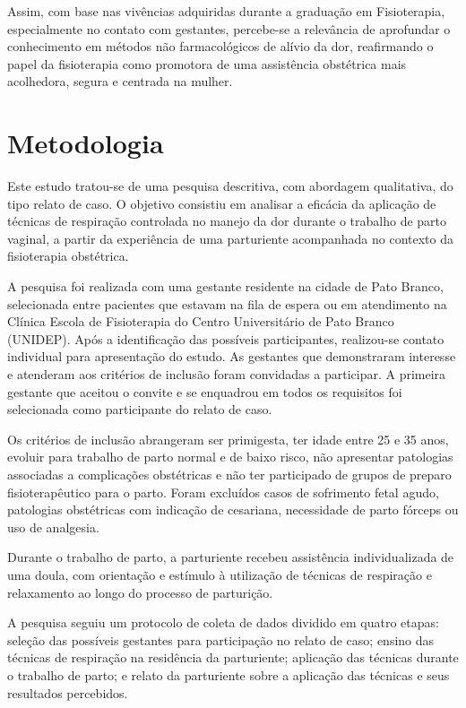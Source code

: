 \documentclass[openright]{tex/estilos/normas-utf-tex}
\begin{document}
Assim, com base nas vivências adquiridas durante a graduação em Fisioterapia, especialmente no contato com gestantes, percebe-se a relevância de aprofundar o conhecimento em métodos não farmacológicos de alívio da dor, reafirmando o papel da fisioterapia como promotora de uma assistência obstétrica mais acolhedora, segura e centrada na mulher.

\chapter{Metodologia}
\label{chap:metodologia}

Este estudo tratou-se de uma pesquisa descritiva, com abordagem qualitativa, do tipo relato de caso. O objetivo consistiu em analisar a eficácia da aplicação de técnicas de respiração controlada no manejo da dor durante o trabalho de parto vaginal, a partir da experiência de uma parturiente acompanhada no contexto da fisioterapia obstétrica.

A pesquisa foi realizada com uma gestante residente na cidade de Pato Branco, selecionada entre pacientes que estavam na fila de espera ou em atendimento na Clínica Escola de Fisioterapia do Centro Universitário de Pato Branco (UNIDEP). Após a identificação das possíveis participantes, realizou-se contato individual para apresentação do estudo. As gestantes que demonstraram interesse e atenderam aos critérios de inclusão foram convidadas a participar. A primeira gestante que aceitou o convite e se enquadrou em todos os requisitos foi selecionada como participante do relato de caso.

Os critérios de inclusão abrangeram ser primigesta, ter idade entre 25 e 35 anos, evoluir para trabalho de parto normal e de baixo risco, não apresentar patologias associadas a complicações obstétricas e não ter participado de grupos de preparo fisioterapêutico para o parto. Foram excluídos casos de sofrimento fetal agudo, patologias obstétricas com indicação de cesariana, necessidade de parto fórceps ou uso de analgesia.

Durante o trabalho de parto, a parturiente recebeu assistência individualizada de uma doula, com orientação e estímulo à utilização de técnicas de respiração e relaxamento ao longo do processo de parturição.

A pesquisa seguiu um protocolo de coleta de dados dividido em quatro etapas: seleção das possíveis gestantes para participação no relato de caso; ensino das técnicas de respiração na residência da parturiente; aplicação das técnicas durante o trabalho de parto; e relato da parturiente sobre a aplicação das técnicas e seus resultados percebidos.
\end{document}
